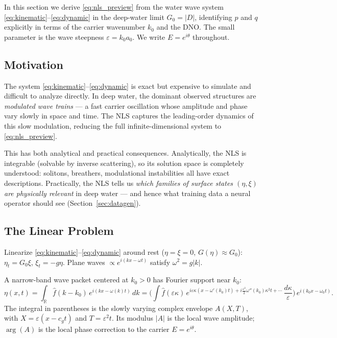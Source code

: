 \documentclass[11pt]{article}
\newcommand{\R}{\mathbb{R}}
\newcommand{\eps}{\varepsilon}
\begin{document}
In this section we derive \eqref{eq:nls_preview} from the water wave
system \eqref{eq:kinematic}--\eqref{eq:dynamic} in the deep-water limit
$G_0 = |D|$, identifying $p$ and $q$ explicitly in terms of the carrier
wavenumber $k_0$ and the DNO.
The small parameter is the wave steepness $\eps = k_0 a_0$.
We write $E = e^{i\theta}$ throughout.

\subsection{Motivation}

The system \eqref{eq:kinematic}--\eqref{eq:dynamic} is exact but
expensive to simulate and difficult to analyze directly.
In deep water, the dominant observed structures are \emph{modulated
wave trains} --- a fast carrier oscillation whose amplitude and phase
vary slowly in space and time.
The NLS captures the leading-order dynamics of this slow modulation,
reducing the full infinite-dimensional system to \eqref{eq:nls_preview}.

This has both analytical and practical consequences.
Analytically, the NLS is integrable (solvable by inverse scattering),
so its solution space is completely understood: solitons, breathers,
modulational instabilities all have exact descriptions.
Practically, the NLS tells us \emph{which families of surface states
$(\eta, \xi)$ are physically relevant} in deep water --- and hence
what training data a neural operator should see (Section~\ref{sec:datagen}).

\subsection{The Linear Problem}

Linearize \eqref{eq:kinematic}--\eqref{eq:dynamic} around rest
($\eta = \xi = 0$, $G(\eta) \approx G_0$):
$\eta_t = G_0\xi$, $\xi_t = -g\eta$.
Plane waves $\propto e^{i(kx-\omega t)}$ satisfy $\omega^2 = g|k|$.

A narrow-band wave packet centered at $k_0 > 0$ has Fourier support
near $k_0$:
\[
\eta(x,t) = \int_{\R} \hat f(k-k_0)\,e^{i(kx-\omega(k)t)}\,dk
= \biggl(\int \hat f(\eps\kappa)\,e^{i\eps\kappa(x - \omega'(k_0)t)
+ i\frac{\eps^2}{2}\omega''(k_0)\kappa^2 t + \cdots}\,\frac{d\kappa}{\eps}\biggr)\,
e^{i(k_0 x - \omega_0 t)}.
\]
The integral in parentheses is the slowly varying complex envelope $A(X,T)$,
with $X = \eps(x - c_g t)$ and $T = \eps^2 t$.
Its modulus $|A|$ is the local wave amplitude;
$\arg(A)$ is the local phase correction to the carrier $E = e^{i\theta}$.
\end{document}
